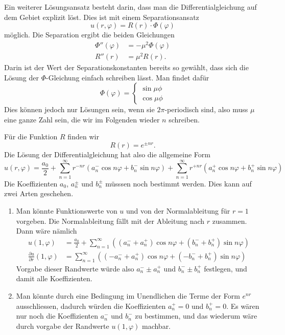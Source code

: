 \begin{loesung}
Ein weiterer Lösungsansatz besteht darin, dass man die Differentialgleichung
auf dem Gebiet explizit löst.
Dies ist mit einem Separationsansatz
\[
u(r,\varphi) = R(r) \cdot \Phi(\varphi)
\]
möglich.
Die Separation ergibt die beiden Gleichungen
\begin{align*}
\Phi''(\varphi)&=-\mu^2\Phi(\varphi)
\\
R''(r)&=\mu^2R(r).
\end{align*}
Darin ist der Wert der Separationskonstanten bereits so gewählt, dass sich
die Lösung der $\Phi$-Gleichung einfach schreiben lässt.
Man findet dafür
\[
\Phi(\varphi) =
\begin{cases}
\sin\mu\phi\\
\cos\mu\phi
\end{cases}
\]
Dies können jedoch nur Lösungen sein, wenn sie $2\pi$-periodisch sind,
also muss $\mu$ eine ganze Zahl sein, die wir im Folgenden wieder $n$
schreiben.

Für die Funktion $R$ finden wir
\[
R(r) = e^{\pm nr}.
\]
Die Lösung der Differentialgleichung hat also die allgemeine
Form
\[
u(r,\varphi)
=
\frac{a_0}2
+
\sum_{n=1}^\infty
r^{-nr}(a_n^- \cos n\varphi + b_n^- \sin n\varphi)
+
\sum_{n=1}^\infty
r^{+nr}(a_n^+ \cos n\varphi + b_n^+ \sin n\varphi)
\]
Die Koeffizienten $a_0$, $a_n^\pm$ und $b_n^\pm$ müsssen noch bestimmt
werden.
Dies kann auf zwei Arten geschehen.
\begin{enumerate}
\item Man könnte Funktionswerte von $u$ und von der Normalableitung für
$r=1$ vorgeben.
Die Normalableitung fällt mit der Ableitung nach $r$ zusammen.
Dann wäre nämlich
\begin{align*}
u(1,\varphi)
&=
\frac{a_0}2
+
\sum_{n=1}^\infty ((a_n^-+a_n^+)\cos n\varphi + (b_n^-+b_n^+)\sin n\varphi)
\\
\frac{\partial u}{\partial r}(1,\varphi)
&=
\sum_{n=1}^\infty ((-a_n^-+a_n^+)\cos n\varphi + (-b_n^-+b_n^+)\sin n\varphi)
\end{align*}
Vorgabe dieser Randwerte würde also $a_n^-\pm a_n^+$ und $b_n^-\pm b_n^+$
festlegen, und damit alle Koeffizienten.
\item
Man könnte durch eine Bedingung im Unendlichen die Terme der Form $e^{nr}$
ausschliessen, dadurch würden die Koeffizienten $a_n^+=0$ und $b_n^+=0$.
Es wären nur noch die Koeffizienten $a_n^-$ und $b_n^-$ zu bestimmen,
und das wiederum wäre durch vorgabe der Randwerte $u(1,\varphi)$
machbar.
\qedhere
\end{enumerate}
\end{loesung}

